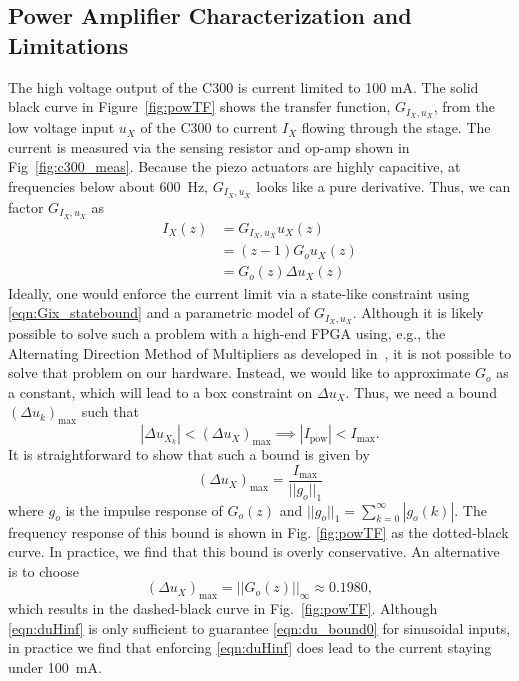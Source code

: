 \documentclass[twocolumn,twoside]{IEEEtran}
\begin{document}
\subsection{Power Amplifier Characterization and Limitations}\label{sec:powcharct}
The high voltage output of the C300 is current limited to 100 mA. The solid black curve in Figure~\ref{fig:powTF} shows the transfer function, $G_{I_X,u_X}$, from the low voltage input $u_X$ of the C300 to current $I_X$ flowing through the stage. The current is measured via the sensing resistor and op-amp shown in Fig~\ref{fig:c300_meas}. Because the piezo actuators are highly capacitive, at frequencies below about 600~Hz, $G_{I_X,u_X}$ looks like a pure derivative.
Thus, we can factor $G_{I_X,u_X}$ as
\begin{align}
  I_{X}(z) &= G_{I_X,u_X} u_X(z)\label{eqn:Gix_statebound}\\
          & = (z-1) G_o u_X(z)\nonumber\\
          & = G_o(z) \Delta u_X(z) \label{eqn:Gostatebound}
\end{align}
Ideally, one would enforce the current limit via a state-like constraint using \eqref{eqn:Gix_statebound} and a parametric model of $G_{I_X,u_X}$.
Although it is likely possible to solve such a problem with a high-end FPGA using, e.g., the Alternating Direction Method of Multipliers as developed in~\cite{Jerez_Trans_2014}, it is not possible to solve that problem on our hardware. Instead, we would like to approximate $G_o$ as a constant, which will lead to a box constraint on $\Delta u_X$. Thus, we need a bound $(\Delta u_k)_{\text{max}}$ such that
\begin{equation}
  |\Delta u_{X_k}| < (\Delta u_X)_{\text{max}} \implies |I_{\text{pow}}| < I_{\text{max}}.\label{eqn:du_bound0}
\end{equation}
It is straightforward to show that such a bound is given by 
\begin{equation}
(\Delta u_X)_{\text{max}} = \frac{I_{\text{max}}}{||g_o||_1}\label{eqn:h1bound}
\end{equation}
where $g_o$ is the impulse response of $G_o(z)$ and ${||g_o||_1 = \sum_{k=0}^{\infty}|g_o(k)|}$. The frequency response of this bound is shown in Fig. \ref{fig:powTF} as the dotted-black curve. In practice, we find that this bound is overly conservative. An alternative is to choose
\begin{equation}
(\Delta u_X)_{\text{max}} = ||G_o(z)||_{\infty}\approx 0.1980, \label{eqn:duHinf}
\end{equation}
which results in the dashed-black curve in Fig.~\ref{fig:powTF}. Although \eqref{eqn:duHinf} is only sufficient to guarantee \eqref{eqn:du_bound0} for sinusoidal inputs, in practice we find that enforcing \eqref{eqn:duHinf} does lead to the current staying under 100~mA.
\end{document}
